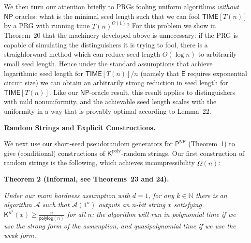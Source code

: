 We then turn our attention briefly to PRGs fooling uniform algorithms \emph{without} ${\mathsf{NP}}$ oracles: what is the minimal seed length such that we can fool ${\mathsf{TIME}}[T(n)]$ by a PRG with running time $T(n)^{O(1)}$? For this problem we show in Theorem 20 that the machinery developed above is unnecessary: if the PRG is capable of simulating the distinguishers it is trying to fool, there is a straighforward method which can reduce seed length $O(\log n)$ to arbitrarily small seed length. Hence under the standard assumptions that achieve logarithmic seed length for ${\mathsf{TIME}}[T(n)]/n$ (namely that ${\mathsf{E}}$ requires exponential circuit size) we can obtain an arbitrarily strong reduction in seed length for ${\mathsf{TIME}}[T(n)]$. Like our ${\mathsf{NP}}$-oracle result, this result applies to distinguishers with mild nonuniformity, and the achievable seed length scales with the uniformity in a way that is provably optimal according to Lemma 22.\par




\par\medskip\noindent\textbf{Random Strings and Explicit Constructions.}\par




We next use our short-seed pseudorandom generators for ${\mathsf{P}}^{{\mathsf{NP}}}$ (Theorem 1) to give (conditional) constructions of ${\mathsf{K}}^{\mathrm{poly}}$-random strings. Our first construction of random strings is the following, which achieves incompressibility $\tilde{\Omega}(n)$:\par





\par\medskip\noindent\textbf{
\textbf{Theorem 2}\textbf{ }(Informal, see Theorems 23 and 24)\textbf{.}
}\par



\emph{Under our main hardness assumption with $d=1$, for any $k\in\mathbb{N}$ there is an algorithm $\mathcal{A}$ such that $\mathcal{A}(1^{n})$ outputs an $n$-bit string $x$ satisfying ${\mathsf{K}}^{n^{k}}(x)\geq\frac{n}{{\mathsf{polylog}}(n)}$ for all $n$; the algorithm will run in polynomial time if we use the strong form of the assumption, and quasipolynomial time if we use the weak form.}\par





